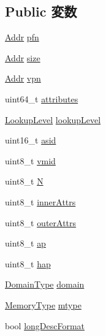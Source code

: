 \subsection*{Public 変数}
\begin{DoxyCompactItemize}
\item 
\hyperlink{classm5_1_1params_1_1Addr}{Addr} \hyperlink{structArmISA_1_1TlbEntry_a66f77e20f7d5ff3157c4ee9eaf72adfc}{pfn}
\item 
\hyperlink{classm5_1_1params_1_1Addr}{Addr} \hyperlink{structArmISA_1_1TlbEntry_a8ce507144b5ef53350af753eafb669f0}{size}
\item 
\hyperlink{classm5_1_1params_1_1Addr}{Addr} \hyperlink{structArmISA_1_1TlbEntry_ad378f7d20675898b2a5994600528fa9a}{vpn}
\item 
uint64\_\-t \hyperlink{structArmISA_1_1TlbEntry_af2477a97f3d64421167ca09818993a8d}{attributes}
\item 
\hyperlink{namespaceArmISA_aefa4213b348e38ee69f2a6109563a7bd}{LookupLevel} \hyperlink{structArmISA_1_1TlbEntry_a88477771eb7d27741455a8035678c67a}{lookupLevel}
\item 
uint16\_\-t \hyperlink{structArmISA_1_1TlbEntry_a984a2dcfd9509ab586bee117bb2a7cfb}{asid}
\item 
uint8\_\-t \hyperlink{structArmISA_1_1TlbEntry_add293169f7f2ac526b3fa14f950cf0bb}{vmid}
\item 
uint8\_\-t \hyperlink{structArmISA_1_1TlbEntry_a77200420e0e4a3db85d736b7a0b91f64}{N}
\item 
uint8\_\-t \hyperlink{structArmISA_1_1TlbEntry_acf1e099a3b1f79dcf9db2007bdfd4c51}{innerAttrs}
\item 
uint8\_\-t \hyperlink{structArmISA_1_1TlbEntry_a8f3ab6c1b3ebb9db965b8cc788b0dab4}{outerAttrs}
\item 
uint8\_\-t \hyperlink{structArmISA_1_1TlbEntry_af0965a83f15ef1c7fae65446c4b6b86d}{ap}
\item 
uint8\_\-t \hyperlink{structArmISA_1_1TlbEntry_a8652932397f601905aff0b8327951acc}{hap}
\item 
\hyperlink{structArmISA_1_1TlbEntry_a0595b41cfb7d03f18438f9c355a3469d}{DomainType} \hyperlink{structArmISA_1_1TlbEntry_accddad3ef7d0db5aa7c34d730fc03a33}{domain}
\item 
\hyperlink{structArmISA_1_1TlbEntry_a462bfa9dfea81692463ecb192183dd01}{MemoryType} \hyperlink{structArmISA_1_1TlbEntry_adf9797b2466c7c1b82e0b738b75d8fab}{mtype}
\item 
bool \hyperlink{structArmISA_1_1TlbEntry_a4e71e701ab0aa7cfed27f93c7b4646f3}{longDescFormat}

\end{DoxyCompactItemize}
